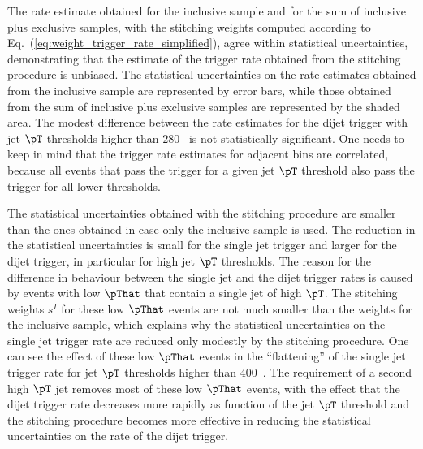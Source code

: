 The rate estimate obtained for the inclusive sample and for the sum of inclusive plus exclusive samples, 
with the stitching weights computed according to Eq.~(\ref{eq:weight_trigger_rate_simplified}),
agree within statistical uncertainties, demonstrating that the estimate of the trigger rate obtained from the stitching procedure is unbiased.
The statistical uncertainties on the rate estimates obtained from the inclusive sample are represented by error bars,
while those obtained from the sum of inclusive plus exclusive samples are represented by the shaded area.
The modest difference between the rate estimates for the dijet trigger with jet $\pT$ thresholds higher than $280$~\GeV
is not statistically significant.
One needs to keep in mind that the trigger rate estimates for adjacent bins are correlated,
because all events that pass the trigger for a given jet $\pT$ threshold also pass the trigger for all lower thresholds.

The statistical uncertainties obtained with the stitching procedure are smaller than the ones obtained in case only the inclusive sample is used.
The reduction in the statistical uncertainties is small for the single jet trigger and larger for the dijet trigger,
in particular for high jet $\pT$ thresholds.
The reason for the difference in behaviour between the single jet and the dijet trigger rates is caused by events with low $\pThat$ that contain a single jet of high $\pT$.
The stitching weights $s^{I}$ for these low $\pThat$ events are not much smaller than the weights for the inclusive sample,
which explains why the statistical uncertainties on the single jet trigger rate are reduced only modestly by the stitching procedure.
One can see the effect of these low $\pThat$ events in the ``flattening'' of the single jet trigger rate for jet $\pT$ thresholds higher than $400$~\GeV.
The requirement of a second high $\pT$ jet removes most of these low $\pThat$ events,
with the effect that the dijet trigger rate decreases more rapidly as function of the jet $\pT$ threshold
and the stitching procedure becomes more effective in reducing the statistical uncertainties on the rate of the dijet trigger.

